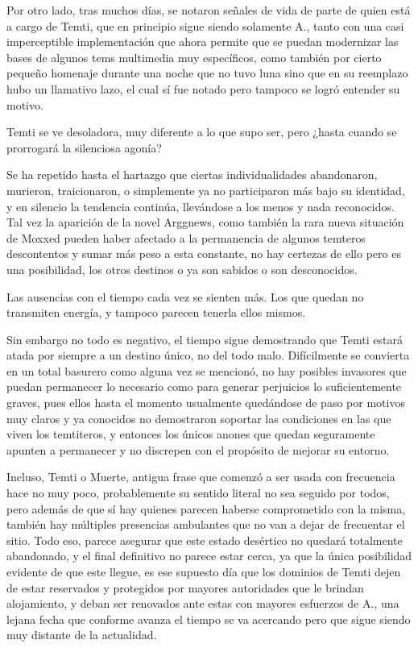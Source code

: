 \documentclass[
]{book}
\begin{document}
Por otro lado, tras muchos días, se notaron señales de vida de parte de quien está a cargo de Temti, que en principio sigue siendo solamente A., tanto con una casi imperceptible implementación que ahora permite que se puedan modernizar las bases de algunos tems multimedia muy específicos, como también por cierto pequeño homenaje durante una noche que no tuvo luna sino que en su reemplazo hubo un llamativo lazo, el cual sí fue notado pero tampoco se logró entender su motivo.

Temti se ve desoladora, muy diferente a lo que supo ser, pero ¿hasta cuando se prorrogará la silenciosa agonía?

Se ha repetido hasta el hartazgo que ciertas individualidades abandonaron, murieron, traicionaron, o simplemente ya no participaron más bajo su identidad, y en silencio la tendencia continúa, llevándose a los menos y nada reconocidos.
Tal vez la aparición de la novel Arggnews, como también la rara nueva situación de Moxxed pueden haber afectado a la permanencia de algunos temteros descontentos y sumar más peso a esta constante, no hay certezas de ello pero es una posibilidad, los otros destinos o ya son sabidos o son desconocidos.

Las ausencias con el tiempo cada vez se sienten más. Los que quedan no transmiten energía, y tampoco parecen tenerla ellos mismos.

Sin embargo no todo es negativo, el tiempo sigue demostrando que Temti estará atada por siempre a un destino único, no del todo malo. Difícilmente se convierta en un total basurero como alguna vez se mencionó, no hay posibles invasores que puedan permanecer lo necesario como para generar perjuicios lo suficientemente graves, pues ellos hasta el momento usualmente quedándose de paso por motivos muy claros y ya conocidos no demostraron soportar las condiciones en las que viven los temtiteros, y entonces los únicos anones que quedan seguramente apunten a permanecer y no discrepen con el propósito de mejorar su entorno.

Incluso, Temti o Muerte, antigua frase que comenzó a ser usada con frecuencia hace no muy poco, probablemente su sentido literal no sea seguido por todos, pero además de que sí hay quienes parecen haberse comprometido con la misma, también hay múltiples presencias ambulantes que no van a dejar de frecuentar el sitio. Todo eso, parece asegurar que este estado desértico no quedará totalmente abandonado, y el final definitivo no parece estar cerca, ya que la única posibilidad evidente de que este llegue, es ese supuesto día que los dominios de Temti dejen de estar reservados y protegidos por mayores autoridades que le brindan alojamiento, y deban ser renovados ante estas con mayores esfuerzos de A., una lejana fecha que conforme avanza el tiempo se va acercando pero que sigue siendo muy distante de la actualidad.
\end{document}
